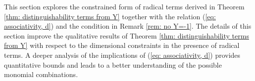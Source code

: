 \documentclass[10pt]{article}
\theoremstyle{remark}%
\theoremstyle{definition}%
\begin{document}

This section explores the constrained form of radical terms derived in Theorem \ref{thm: distinguishability terms from Y} together with the relation (\ref{eq: associativity, d}) and the condition in Remark \ref{rem: no Y=-1}. The details of this section improve the qualitative results of Theorem \ref{thm: distinguishability terms from Y} with respect to the dimensional constraints in the presence of radical terms. A deeper analysis of the implications of (\ref{eq: associativity, d}) provides quantitative bounds and leads to a better understanding of the possible monomial combinations. 
\end{document}

